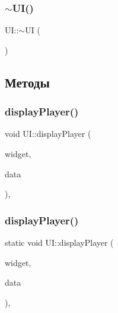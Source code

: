 \mbox{\label{class_u_i_a1b23d0c64c7cbb3d143d90ec532a7ccd}} 
\subsubsection{\texorpdfstring{$\sim$\+U\+I()}{~UI()}\hspace{0.1cm}{\footnotesize\ttfamily [2/2]}}
{\footnotesize\ttfamily U\+I\+::$\sim$\+UI (\begin{DoxyParamCaption}{ }\end{DoxyParamCaption})}



\subsection{Методы}
\mbox{\label{class_u_i_a48bcf14dfe5f38c4c531bf11f7e7217a}} 
\subsubsection{\texorpdfstring{display\+Player()}{displayPlayer()}\hspace{0.1cm}{\footnotesize\ttfamily [1/2]}}
{\footnotesize\ttfamily void U\+I\+::display\+Player (\begin{DoxyParamCaption}\item[{Gtk\+Widget $\ast$}]{widget,  }\item[{gpointer}]{data }\end{DoxyParamCaption})\hspace{0.3cm}{\ttfamily [static]}, {\ttfamily [private]}}

\mbox{\label{class_u_i_ae033d92357c8c8a175809bbee3e08b9b}} 
\subsubsection{\texorpdfstring{display\+Player()}{displayPlayer()}\hspace{0.1cm}{\footnotesize\ttfamily [2/2]}}
{\footnotesize\ttfamily static void U\+I\+::display\+Player (\begin{DoxyParamCaption}\item[{Gtk\+Widget $\ast$}]{widget,  }\item[{gpointer}]{data }\end{DoxyParamCaption})\hspace{0.3cm}{\ttfamily [static]}, {\ttfamily [private]}}

